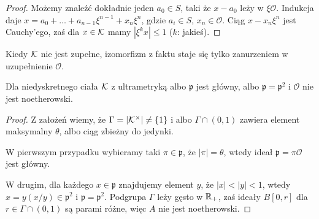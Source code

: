 \begin{proof}
	Możemy znaleźć dokładnie jeden $a_0 \in S$, taki że $x - a_0$ leży w $\xi \mathcal O$. 
	Indukcja daje $x = a_0 + \ldots + a_{n-1} \xi^{n-1} + x_n \xi^n$, gdzie $a_i \in S$, $x_n \in \mathcal O$.
	Ciąg $x - x_n \xi^n$ jest Cauchy'ego, zaś dla $x \in \mathcal K$ mamy $|\xi^k x| \le 1$ ($k$: jakieś).
\end{proof}

Kiedy $\mathcal K$ nie jest zupełne, izomorfizm z faktu staje się tylko zanurzeniem w uzupełnienie $\mathcal O$.

\begin{fakt} %
	Dla niedyskretnego ciała $\mathcal K$ z ultrametryką albo $\mathfrak p$ jest główny, albo $\mathfrak p = \mathfrak p^2$ i $\mathcal O$ nie jest noetherowski.
\end{fakt}

\begin{proof}
	Z założeń wiemy, że $\Gamma = |\mathcal K^\times| \neq \{1\}$ i albo $\Gamma \cap (0, 1)$ zawiera element maksymalny $\theta$, albo ciąg zbieżny do jedynki.

	W pierwszym przypadku wybieramy taki $\pi \in \mathfrak p$, że $|\pi| = \theta$, wtedy ideał $\mathfrak p = \pi \mathcal O$ jest główny.

	W drugim, dla każdego $x \in \mathfrak p$ znajdujemy element $y$, że $|x| < |y| < 1$, wtedy $x = y (x/y) \in \mathfrak p^2$ i $\mathfrak p = \mathfrak p^2$.
	Podgrupa $\Gamma$ leży gęsto w $\mathbb R_+$, zaś ideały $B[0, r]$ dla $r \in \Gamma \cap (0,1)$ są parami różne, więc $A$ nie jest noetherowski.
\end{proof}